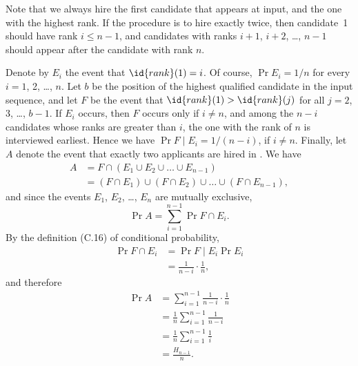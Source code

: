 Note that we always hire the first candidate that appears at input, and the one with the highest rank.
If the  procedure is to hire exactly twice, then candidate~1 should have rank $i\le n-1$, and candidates with ranks $i+1$, $i+2$, \dots, $n-1$ should appear after the candidate with rank $n$.

Denote by $E_i$ the event that $\id{rank}(1)=i$.
Of course, $\Pr{E_i}=1/n$ for every $i=1$, 2, \dots, $n$.
Let $b$ be the position of the highest qualified candidate in the input sequence, and let $F$ be the event that $\id{rank}(1)>\id{rank}(j)$ for all $j=2$, 3, \dots, $b-1$.
If $E_i$ occurs, then $F$ occurs only if $i\ne n$, and among the $n-i$ candidates whose ranks are greater than $i$, the one with the rank of $n$ is interviewed earliest.
Hence we have $\Pr{F\mid E_i}=1/(n-i)$, if $i\ne n$.
Finally, let $A$ denote the event that exactly two applicants are hired in .
We have
\begin{align*}
    A &= F\cap(E_1\cup E_2\cup\dots\cup E_{n-1}) \\
    &= (F\cap E_1)\cup(F\cap E_2)\cup\dots\cup(F\cap E_{n-1}),
\end{align*}
and since the events $E_1$, $E_2$, \dots, $E_n$ are mutually exclusive,
\[
    \Pr{A} = \sum_{i=1}^{n-1}\Pr{F\cap E_i}.
\]
By the definition (C.16) of conditional probability,
\begin{align*}
    \Pr{F\cap E_i} &= \Pr{F\mid E_i}\Pr{E_i} \\
    &= \frac{1}{n-i}\cdot\frac{1}{n},
\end{align*}
and therefore
\begin{align*}
    \Pr{A} &= \sum_{i=1}^{n-1}\frac{1}{n-i}\cdot\frac{1}{n} \\
    &= \frac{1}{n}\sum_{i=1}^{n-1}\frac{1}{n-i} \\
    &= \frac{1}{n}\sum_{i=1}^{n-1}\frac{1}{i} \\[1mm]
    &= \frac{H_{n-1}}{n}.
\end{align*}
